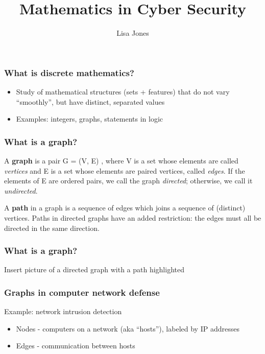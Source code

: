 \documentclass[11pt]{beamer}
\begin{document}
\author{Lisa Jones}
\title{Mathematics in Cyber Security}
\frame[plain]{\maketitle}


\begin{frame}
\frametitle{What is discrete mathematics?}
  \begin{itemize}
  \item{Study of mathematical structures (sets + features) that do not vary ``smoothly'', but have distinct, separated values}
    \medskip
  \item{Examples: integers, graphs, statements in logic}
  \end{itemize}
\end{frame}



  \begin{frame}
\frametitle{What is a graph?}
\begin{definition} A \textbf{graph} is a pair  G = (V, E) ,
  where V is a set whose elements are called \textit{vertices} and
  E is a set whose elements are paired vertices, called \textit{edges}.
  If the elements of E are ordered pairs, we call the graph \textit{directed}; otherwise, we call it \textit{undirected}.
\end{definition}
\bigskip
\begin{definition}
  A \textbf{path} in a graph is a sequence of edges which joins a sequence of (distinct) vertices. Paths in directed graphs have an added restriction: the edges must all be directed in the same direction.
\end{definition}
  \end{frame}

  \begin{frame}
\frametitle{What is a graph?}
Insert picture of a directed graph with a path highlighted
\end{frame}

  
  \begin{frame}
\frametitle{Graphs in computer network defense}
Example: network intrusion detection
\bigskip
\begin{itemize}
  \item{Nodes - computers on a network (aka ``hosts''), labeled by IP addresses}
    \medskip
  \item{Edges - communication between hosts}
  \end{itemize}
  \end{frame}
\end{document}
